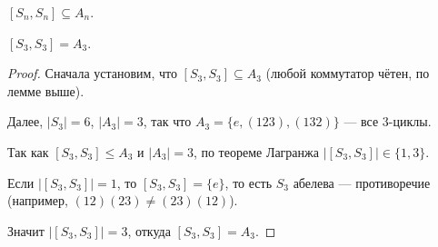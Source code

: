 \begin{cor}
    $[S_n, S_n] \subseteq A_n$.
\end{cor}

\begin{stmt}
    $[S_3, S_3] = A_3$.
    \begin{proof}
        Сначала установим, что $[S_3, S_3] \subseteq A_3$ (любой коммутатор чётен, по лемме выше).
 
        Далее, $|S_3| = 6$, $|A_3| = 3$, так что $A_3 = \{e, (123), (132)\}$ --- все 3-циклы.
 
        Так как $[S_3, S_3] \leq A_3$ и $|A_3| = 3$, по теореме Лагранжа $|[S_3, S_3]| \in \{1, 3\}$.
 
        Если $|[S_3, S_3]| = 1$, то $[S_3, S_3] = \{e\}$, то есть $S_3$ абелева --- противоречие (например, $(12)(23) \neq (23)(12)$).
 
        Значит $|[S_3, S_3]| = 3$, откуда $[S_3, S_3] = A_3$.
    \end{proof}
\end{stmt}
 
